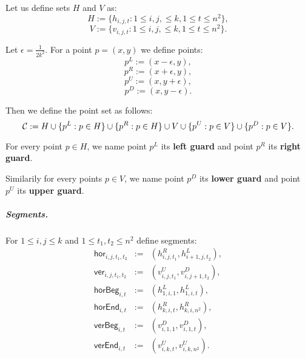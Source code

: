 Let us define sets $H$ and $V$ as:
$$H := \{h_{i, j, t} : 1 \le i, j, \le k, 1 \le t \le n^2\},$$
$$V := \{v_{i, j, t} : 1 \le i, j, \le k, 1 \le t \le n^2\}.$$
	
Let $\epsilon = \frac{1}{2k^2}$.
For a point $p = (x, y)$ we define points:
$$p^{L} := (x - \epsilon, y),$$
$$p^{R} := (x + \epsilon, y),$$
$$p^{U} := (x, y + \epsilon),$$
$$p^{D} := (x, y - \epsilon).$$

Then we define the point set as follows:
$$\mathcal{C} := H \cup \{p^L : p \in H\} \cup \{p^R : p \in H\}
\cup V \cup \{p^U : p \in V\} \cup \{p^D : p \in V\}.$$

\begin{defi}
	\label{guard_def}
	For every point $p \in H$, we name point $p^L$ its \textbf{left guard}
	and point $p^R$ its \textbf{right guard}.
	
	Similarily for every points $p \in V$, we name point $p^D$ its \textbf{lower guard}
	and point $p^U$ its \textbf{upper guard}.
\end{defi}

\subparagraph{Segments.}
\newcommand{\hor}[4]{\mathsf{hor}_{#1,#2,#3,#4}}
\newcommand{\ver}[4]{\mathsf{ver}_{#1,#2,#3,#4}}
\newcommand{\horbeg}[2]{\mathsf{horBeg}_{#1,#2}}
\newcommand{\verbeg}[2]{\mathsf{verBeg}_{#1,#2}}
\newcommand{\horend}[2]{\mathsf{horEnd}_{#1,#2}}
\newcommand{\verend}[2]{\mathsf{verEnd}_{#1,#2}}

For $1 \le i,j \le k$ and $1 \le t_1, t_2 \le n^2$ define segments:
\begin{eqnarray*}
\hor{i}{j}{t_1}{t_2} & := & (h^R_{i,j,t_1}, h^L_{i+1, j, t_2}), \\
\ver{i}{j}{t_1}{t_2} & := & (v^U_{i,j,t_1}, v^D_{i, j+1, t_2}), \\
\horbeg{i}{t} & := & (h^L_{1, i, 1}, h^L_{1, i, t}), \\
\horend{i}{t} & := & (h^R_{k, i, t}, h^R_{k, i, n^2}), \\
\verbeg{i}{t} & := & (v^D_{i, 1, 1}, v^D_{i, 1, t}), \\
\verend{i}{t} & := & (v^U_{i, k, t}, v^U_{i, k, n^2}). \\
\end{eqnarray*}

\newcommand{\allhor}{\mathsf{HOR}}
\newcommand{\allver}{\mathsf{VER}}
\newcommand{\alldiag}{\mathsf{DIAG}}

